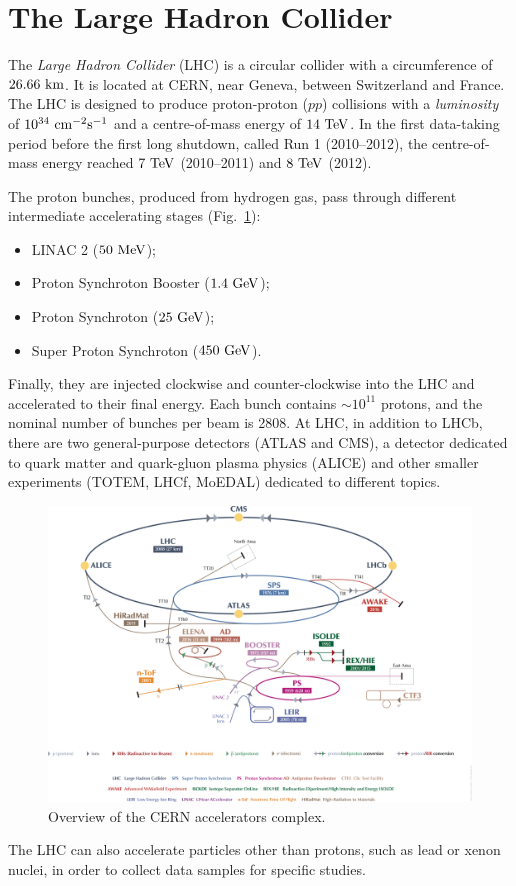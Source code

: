 \section{The Large Hadron Collider}
\label{sec:lhc}

The \emph{Large Hadron Collider} (LHC) is a circular collider with a circumference of $26.66~\rm km$. It is located at CERN, near Geneva, between Switzerland and France.
The LHC is designed to produce proton-proton ($pp$) collisions with a \emph{luminosity} of $10^{34}~\rm cm^{-2}\rm s^{-1}$ and a centre-of-mass energy of $14~\rm TeV$.
In the first data-taking period before the first long shutdown, called Run 1 (2010--2012), the centre-of-mass energy reached $7~\rm TeV$ (2010--2011) and $8~\rm TeV$ (2012). 

The proton bunches, produced from hydrogen gas, pass through different intermediate accelerating stages (Fig.~\ref{fig:accelerators}):
\begin{itemize}[noitemsep,topsep=0pt]
	\item LINAC 2 ($50~\rm MeV$);
	\item Proton Synchroton Booster ($1.4~\rm GeV$);
	\item Proton Synchroton ($25~\rm GeV$);
	\item Super Proton Synchroton ($450~\rm GeV$).
\end{itemize}
Finally, they are injected clockwise and counter-clockwise into the LHC and accelerated to their final energy. 
Each bunch contains $\sim 10^{11}$ protons, and the nominal number of bunches per beam is 2808.
At LHC, in addition to LHCb, there are two general-purpose detectors (ATLAS and CMS), a detector dedicated to quark matter and quark-gluon plasma physics (ALICE) and other smaller experiments (TOTEM, LHCf, MoEDAL) dedicated to different topics.

\begin{figure}[htbp]
  \begin{center}
    \includegraphics[width=1.1\textwidth]{01LHC/figs/accelerators.png}
  \end{center}
  \vspace{-2mm}
  \caption{Overview of the CERN accelerators complex.}
  \label{fig:accelerators}
\end{figure}

The LHC can also accelerate particles other than protons, such as lead or xenon nuclei, in order to collect data samples for specific studies.
